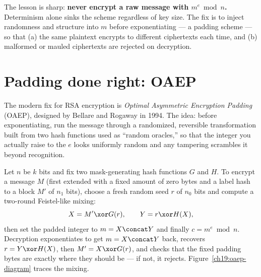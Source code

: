 \begin{trapbox}
The lesson is sharp: \textbf{never encrypt a raw message with $m^e\bmod n$.} Determinism alone sinks the scheme regardless of key size. The fix is to inject randomness and structure into $m$ before exponentiating --- a padding scheme --- so that (a) the same plaintext encrypts to different ciphertexts each time, and (b) malformed or mauled ciphertexts are rejected on decryption.
\end{trapbox}

\section{Padding done right: OAEP}
\label{ch19:oaep}

The modern fix for RSA encryption is \emph{Optimal Asymmetric Encryption Padding} (OAEP), designed by Bellare and Rogaway in 1994. The idea: before exponentiating, run the message through a randomized, reversible transformation built from two hash functions used as ``random oracles,'' so that the integer you actually raise to the $e$ looks uniformly random and any tampering scrambles it beyond recognition.

Let $n$ be $k$ bits and fix two mask-generating hash functions $G$ and $H$. To encrypt a message $M$ (first extended with a fixed amount of zero bytes and a label hash to a block $M'$ of $n_1$ bits), choose a fresh random seed $r$ of $n_0$ bits and compute a two-round Feistel-like mixing:
\[
  X = M' \xor G(r), \qquad Y = r \xor H(X),
\]
then set the padded integer to $m = X\concat Y$ and finally $c = m^e\bmod n$. Decryption exponentiates to get $m=X\concat Y$ back, recovers $r = Y\xor H(X)$, then $M' = X\xor G(r)$, and checks that the fixed padding bytes are exactly where they should be --- if not, it rejects. Figure~\ref{ch19:oaep-diagram} traces the mixing.

